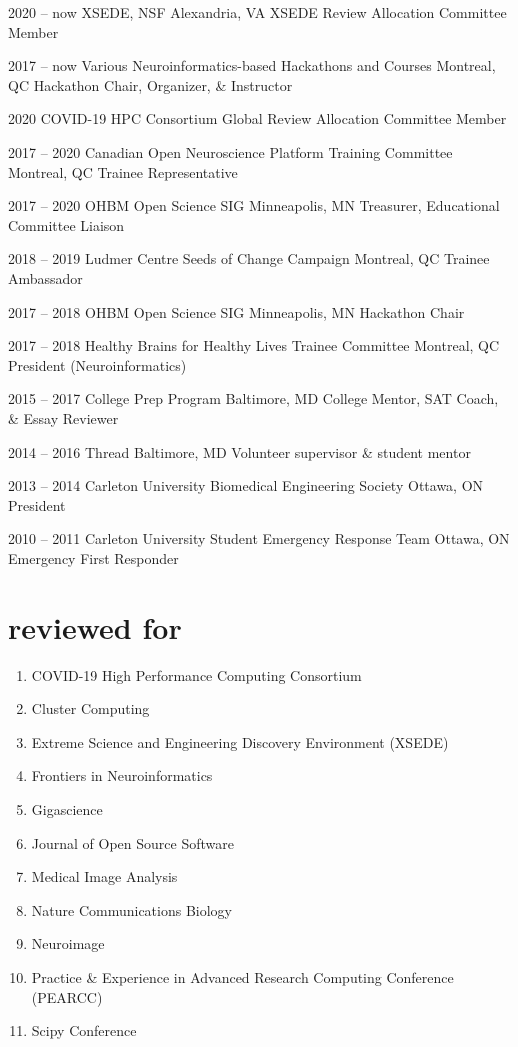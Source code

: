 \documentclass[]{friggeri-cv} %
\begin{document}
\begin{entrylist}
\entry
{2020 -- now}
{XSEDE, NSF}
{Alexandria, VA}
{XSEDE Review Allocation Committee Member}

\entry
{2017 -- now}
{Various Neuroinformatics-based Hackathons and Courses}
{Montreal, QC}
{Hackathon Chair, Organizer, \& Instructor}

\entry
{2020}
{COVID-19 HPC Consortium}
{Global}
{Review Allocation Committee Member}

\entry
{2017 -- 2020}
{Canadian Open Neuroscience Platform Training Committee}
{Montreal, QC}
{Trainee Representative}

\entry
{2017 -- 2020}
{OHBM Open Science SIG}
{Minneapolis, MN}
{Treasurer, Educational Committee Liaison}

\entry
{2018 -- 2019}
{Ludmer Centre Seeds of Change Campaign}
{Montreal, QC}
{Trainee Ambassador}

\entry
{2017 -- 2018}
{OHBM Open Science SIG}
{Minneapolis, MN}
{Hackathon Chair}

\entry
{2017 -- 2018}
{Healthy Brains for Healthy Lives Trainee Committee}
{Montreal, QC}
{President (Neuroinformatics)}

\entry
{2015 -- 2017}
{College Prep Program}
{Baltimore, MD}
{College Mentor, SAT Coach, \& Essay Reviewer}

\entry
{2014 -- 2016}
{Thread}
{Baltimore, MD}
{Volunteer supervisor \& student mentor}

\entry
{2013 -- 2014}
{Carleton University Biomedical Engineering Society}
{Ottawa, ON}
{President}

\entry
{2010 -- 2011}
{Carleton University Student Emergency Response Team}
{Ottawa, ON}
{Emergency First Responder}
\end{entrylist}


\section{reviewed for}
\begin{enumerate}
\item COVID-19 High Performance Computing Consortium
\item Cluster Computing
\item Extreme Science and Engineering Discovery Environment (XSEDE)
\item Frontiers in Neuroinformatics
\item Gigascience
\item Journal of Open Source Software
\item Medical Image Analysis
\item Nature Communications Biology
\item Neuroimage
\item Practice \& Experience in Advanced Research Computing Conference (PEARCC)
\item Scipy Conference
\end{enumerate}
\end{document}
